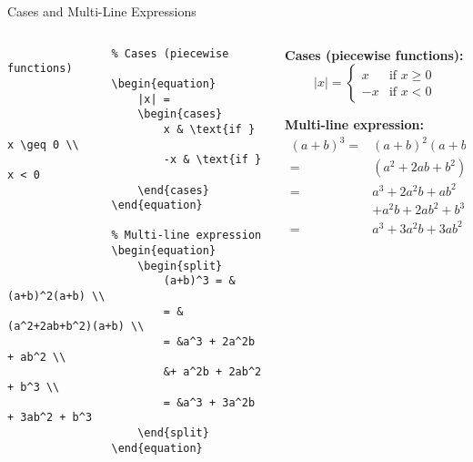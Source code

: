 \begin{frame}[fragile]{Cases and Multi-Line Expressions}
    \begin{columns}
        \begin{column}{0.5\textwidth}
            \begin{lstlisting}
                % Cases (piecewise functions)
                \begin{equation}
                    |x| = 
                    \begin{cases}
                        x & \text{if } x \geq 0 \\
                        -x & \text{if } x < 0
                    \end{cases}
                \end{equation}
                
                % Multi-line expression
                \begin{equation}
                    \begin{split}
                        (a+b)^3 = &(a+b)^2(a+b) \\
                        = &(a^2+2ab+b^2)(a+b) \\
                        = &a^3 + 2a^2b + ab^2 \\
                        &+ a^2b + 2ab^2 + b^3 \\
                        = &a^3 + 3a^2b + 3ab^2 + b^3
                    \end{split}
                \end{equation}
            \end{lstlisting}
        \end{column}
        
        \begin{column}{0.5\textwidth}
            \textbf{Cases (piecewise functions):}
            \begin{equation}
                |x| = 
                \begin{cases}
                    x & \text{if } x \geq 0 \\
                    -x & \text{if } x < 0
                \end{cases}
            \end{equation}
            
            \textbf{Multi-line expression:}
            \begin{equation}
                \begin{split}
                    (a+b)^3 = &(a+b)^2(a+b) \\
                    = &(a^2+2ab+b^2)(a+b) \\
                    = &a^3 + 2a^2b + ab^2 \\
                    &+ a^2b + 2ab^2 + b^3 \\
                    = &a^3 + 3a^2b + 3ab^2 + b^3
                \end{split}
            \end{equation}
            

\end{column}
\end{columns}
\end{frame}
